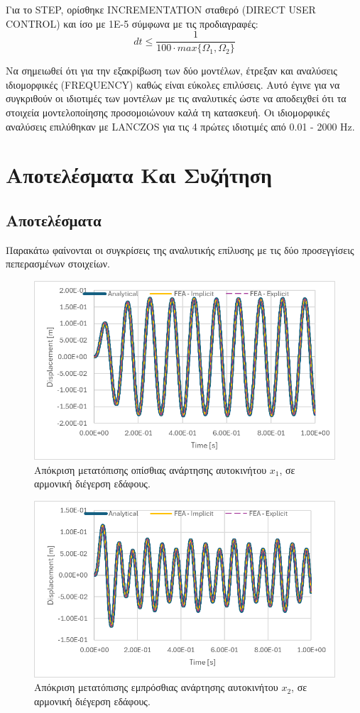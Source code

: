 \documentclass{article}
\begin{document}
Για το STEP, ορίσθηκε INCREMENTATION σταθερό (DIRECT USER CONTROL) και ίσο με 1E-5 σύμφωνα με τις προδιαγραφές:
$$dt \le \frac{1}{100\cdot max\{\Omega_1,\Omega_2\}}$$

Να σημειωθεί ότι για την εξακρίβωση των δύο μοντέλων, έτρεξαν και αναλύσεις ιδιομορφικές (FREQUENCY) καθώς είναι εύκολες επιλύσεις. Αυτό έγινε για να συγκριθούν οι ιδιοτιμές των μοντέλων με τις αναλυτικές ώστε να αποδειχθεί ότι τα στοιχεία μοντελοποίησης προσομοιώνουν καλά τη κατασκευή. Οι ιδιομορφικές αναλύσεις επιλύθηκαν με LANCZOS για τις 4 πρώτες ιδιοτιμές από 0.01 - 2000 Hz.

\section{Αποτελέσματα Και Συζήτηση}
\subsection{Αποτελέσματα}

Παρακάτω φαίνονται οι συγκρίσεις της αναλυτικής επίλυσης με τις δύο προσεγγίσεις πεπερασμένων στοιχείων.

\begin{figure}[H]
    \centering
    \includegraphics[width=0.8\linewidth]{media/d-x1.png}
    \caption{Απόκριση μετατόπισης οπίσθιας ανάρτησης αυτοκινήτου $x_1$, σε αρμονική διέγερση εδάφους.}
    \label{fig:d-x1}
\end{figure}

\begin{figure}[H]
    \centering
    \includegraphics[width=0.8\linewidth]{media/d-x2.png}
    \caption{Απόκριση μετατόπισης εμπρόσθιας ανάρτησης αυτοκινήτου $x_2$, σε αρμονική διέγερση εδάφους.}
    \label{fig:d-x2}
\end{figure}
\end{document}
